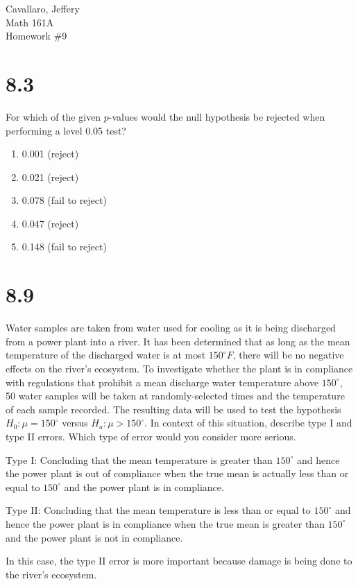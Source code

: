 \documentclass[letterpaper,12pt,fleqn]{article}
\newcommand{\m}{\mu}
\begin{document}
Cavallaro, Jeffery \\
Math 161A \\
Homework \#9

\bigskip

\section*{8.3}

For which of the given \(p\)-values would the null hypothesis be rejected when performing a level 0.05 test?
\begin{enumerate}[label={\alph*)}]
\item 0.001 (reject)
\item 0.021 (reject)
\item 0.078 (fail to reject)
\item 0.047 (reject)
\item 0.148 (fail to reject)
\end{enumerate}

\section*{8.9}

Water samples are taken from water used for cooling as it is being discharged from a power plant into a river.  It has been
determined that as long as the mean temperature of the discharged water is at most \(150^{\circ}F\), there will be no negative
effects on the river's ecosystem.  To investigate whether the plant is in compliance with regulations that prohibit a mean
discharge water temperature above \(150^{\circ}\), 50 water samples will be taken at randomly-selected times and the
temperature of each sample recorded.  The resulting data will be used to test the hypothesis \(H_0:\m=150^{\circ}\) versus
\(H_a:\m>150^{\circ}\).  In context of this situation, describe type I and type II errors.  Which type of error would you
consider more serious.

Type I: Concluding that the mean temperature is greater than \(150^{\circ}\) and hence the power plant is out of compliance
when the true mean is actually less than or equal to \(150^{\circ}\) and the power plant is in compliance.

Type II: Concluding that the mean temperature is less than or equal to \(150^{\circ}\) and hence the power plant is in
compliance when the true mean is greater than \(150^{\circ}\) and the power plant is not in compliance.

In this case, the type II error is more important because damage is being done to the river's ecosystem.
\end{document}
